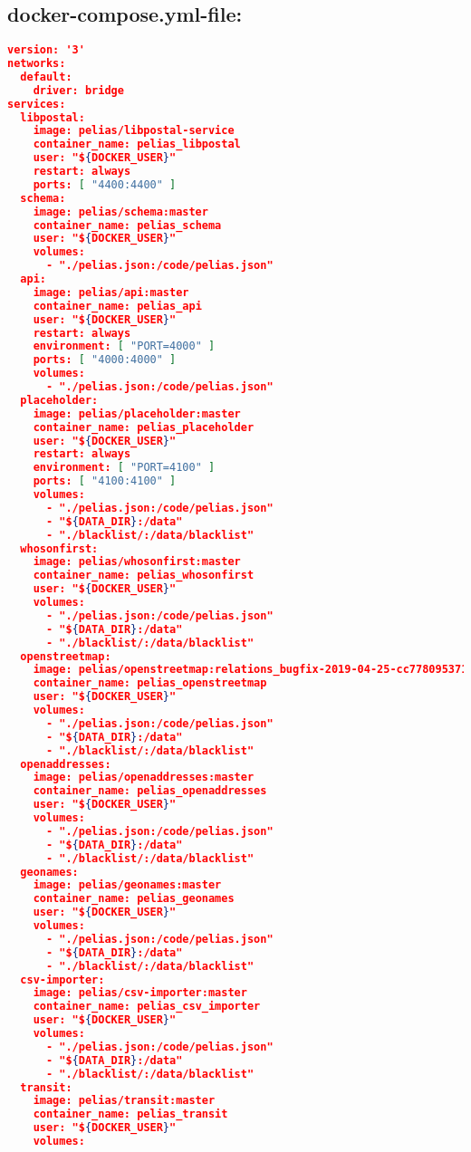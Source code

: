 \subsection{docker-compose.yml-file:}
\begin{lstlisting}[language=json,breaklines=true]
version: '3'
networks:
  default:
    driver: bridge
services:
  libpostal:
    image: pelias/libpostal-service
    container_name: pelias_libpostal
    user: "${DOCKER_USER}"
    restart: always
    ports: [ "4400:4400" ]
  schema:
    image: pelias/schema:master
    container_name: pelias_schema
    user: "${DOCKER_USER}"
    volumes:
      - "./pelias.json:/code/pelias.json"
  api:
    image: pelias/api:master
    container_name: pelias_api
    user: "${DOCKER_USER}"
    restart: always
    environment: [ "PORT=4000" ]
    ports: [ "4000:4000" ]
    volumes:
      - "./pelias.json:/code/pelias.json"
  placeholder:
    image: pelias/placeholder:master
    container_name: pelias_placeholder
    user: "${DOCKER_USER}"
    restart: always
    environment: [ "PORT=4100" ]
    ports: [ "4100:4100" ]
    volumes:
      - "./pelias.json:/code/pelias.json"
      - "${DATA_DIR}:/data"
      - "./blacklist/:/data/blacklist"
  whosonfirst:
    image: pelias/whosonfirst:master
    container_name: pelias_whosonfirst
    user: "${DOCKER_USER}"
    volumes:
      - "./pelias.json:/code/pelias.json"
      - "${DATA_DIR}:/data"
      - "./blacklist/:/data/blacklist"
  openstreetmap:
    image: pelias/openstreetmap:relations_bugfix-2019-04-25-cc778095371c142147e31249947a3b43fb57d46d
    container_name: pelias_openstreetmap
    user: "${DOCKER_USER}"
    volumes:
      - "./pelias.json:/code/pelias.json"
      - "${DATA_DIR}:/data"
      - "./blacklist/:/data/blacklist"
  openaddresses:
    image: pelias/openaddresses:master
    container_name: pelias_openaddresses
    user: "${DOCKER_USER}"
    volumes:
      - "./pelias.json:/code/pelias.json"
      - "${DATA_DIR}:/data"
      - "./blacklist/:/data/blacklist"
  geonames:
    image: pelias/geonames:master
    container_name: pelias_geonames
    user: "${DOCKER_USER}"
    volumes:
      - "./pelias.json:/code/pelias.json"
      - "${DATA_DIR}:/data"
      - "./blacklist/:/data/blacklist"
  csv-importer:
    image: pelias/csv-importer:master
    container_name: pelias_csv_importer
    user: "${DOCKER_USER}"
    volumes:
      - "./pelias.json:/code/pelias.json"
      - "${DATA_DIR}:/data"
      - "./blacklist/:/data/blacklist"
  transit:
    image: pelias/transit:master
    container_name: pelias_transit
    user: "${DOCKER_USER}"
    volumes:

\end{lstlisting}
